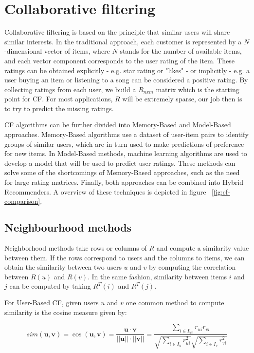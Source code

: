 \documentclass[cic,tc,english]{iiufrgs}
\begin{document}
\section{Collaborative filtering}
Collaborative filtering is based on the principle that similar users will share similar interests. In the traditional approach, each customer is represented by a \(N\)-dimensional vector of items, where \(N\) stands for the number of available items, and each vector component corresponds to the user rating of the item. These ratings can be obtained explicitly - e.g. star rating or "likes" - or implicitly - e.g. a user buying an item or listening to a song can be considered a positive rating. By collecting ratings from each user, we build a \(R_{nxm}\) matrix which is the starting point for CF. For most applications, \(R\) will be extremely sparse, our job then is to try to predict the missing ratings.

CF algorithms can be further divided into Memory-Based and Model-Based approaches. Memory-Based algorithms use a dataset of user-item pairs to identify groups of similar users, which are in turn used to make predictions of preference for new items. In Model-Based methods, machine learning algorithms are used to develop a model that will be used to predict user ratings. These methods can solve some of the shortcomings of Memory-Based approaches, such as the need for large rating matrices. Finally, both approaches can be combined into Hybrid Recommenders. A overview of these techniques is depicted in figure ~\ref{fig:cf-comparison}.

\subsection{Neighbourhood methods}
Neighborhood methods take rows or columns of \(R\) and compute a similarity value between them. If the rows correspond to users and the columns to items, we can obtain the similarity between two users \(u\) and \(v\) by computing the correlation between \(R(u)\) and \(R(v)\). In the same fashion, similarity between items \(i\) and \(j\) can be computed by taking \(R^T(i)\) and \(R^T(j)\).

For User-Based CF, given users \(u\) and \(v\) one common method to compute similarity is the cosine measure given by:

\[sim(\pmb u, \pmb v) = \cos(\pmb u, \pmb v) = \frac {\pmb u \cdot \pmb v}{||\pmb u|| \cdot ||\pmb v||} = \frac{\sum_{i \in I_{uv}} r_{ui}r_{vi}}{\sqrt{\sum_{i \in I_u} r_{ui}^2}\sqrt{\sum_{i \in I_v} r_{vi}^2}}\]
\end{document}
